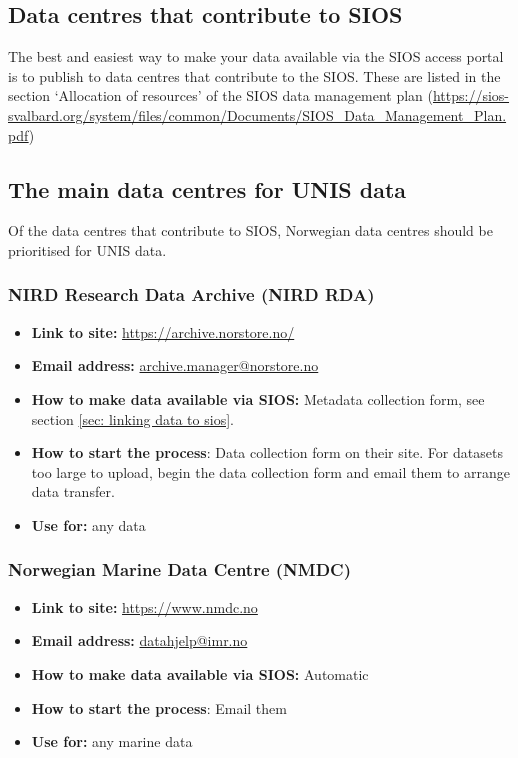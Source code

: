 \documentclass[a4paper,12pt]{article}
\begin{document}
\subsection{Data centres that contribute to SIOS}

The best and easiest way to make your data available via the SIOS access portal is to publish to data centres that contribute to the SIOS. These are listed in the section `Allocation of resources’ of the SIOS data management plan (\url{https://sios-svalbard.org/system/files/common/Documents/SIOS_Data_Management_Plan.pdf})

\subsection{The main data centres for UNIS data}

Of the data centres that contribute to SIOS, Norwegian data centres should be prioritised for UNIS data.

\subsubsection{NIRD Research Data Archive (NIRD RDA)}
\begin{itemize}
    \item \textbf{Link to site:} \url{https://archive.norstore.no/}
    \item \textbf{Email address:} \href{mailto:archive.manager@norstore.no}{archive.manager@norstore.no}
    \item \textbf{How to make data available via SIOS:} Metadata collection form, see section \ref{sec: linking data to sios}.
    \item \textbf{How to start the process}: Data collection form on their site. For datasets too large to upload, begin the data collection form and email them to arrange data transfer.
    \item \textbf{Use for: } any data
\end{itemize}

\subsubsection{Norwegian Marine Data Centre (NMDC)}
\begin{itemize}
    \item \textbf{Link to site:} \url{https://www.nmdc.no}
    \item \textbf{Email address:} \href{mailto:datahjelp@imr.no}{datahjelp@imr.no}
    \item \textbf{How to make data available via SIOS:} Automatic
    \item \textbf{How to start the process}: Email them
    \item \textbf{Use for: } any marine data
\end{itemize}
\end{document}
